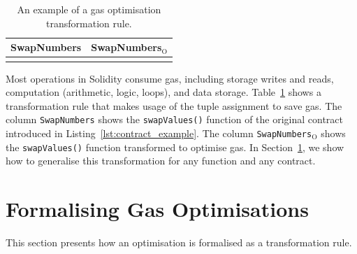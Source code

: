 \documentclass[manuscript,screen,review]{acmart}
\begin{document}
\begin{table}[htb]
\caption{An example of a gas optimisation transformation rule.}
\label{tab:optimisation}
\begin{tabular}{|p{}|p{}|}
\hline
\rowcolor[HTML]{EFEFEF}
\textbf{SwapNumbers} & \textbf{SwapNumbers$_{\mathrm{O}}$} \\ \hline
\adjustbox{valign=t}{%
\begin{minipage}{0.43\textwidth}
\begin{verbatim}

function swapValues() public {
   // Swap using a temporary variable
   uint256 temp;
   temp = A;
   A = B;
   B = temp;
   emit numbersUpdated(msg.sender, A, B);
}
\end{verbatim}
\end{minipage}}
&
\adjustbox{valign=t}{%
\begin{minipage}{0.43\textwidth}
\begin{verbatim}

function swapValues() public {
   // Single-line swap using tuple assignment
   (A, B) = (B, A);
   emit numbersUpdated(msg.sender, A, B);
}
\end{verbatim}
\end{minipage}}
\\ \hline
\end{tabular}
\end{table}
Most operations in Solidity consume gas, including storage writes and reads, computation (arithmetic, logic, loops), and data storage. Table~\ref{tab:optimisation} shows a transformation rule that makes usage of the tuple assignment to save gas. The column \texttt{SwapNumbers} shows the \texttt{swapValues()} function of the original contract introduced in Listing~\ref{lst:contract_example}. The column \texttt{SwapNumbers$_{\mathrm{O}}$} shows the \texttt{swapValues()} function transformed to optimise gas. In Section~\ref{sec:formalising_gas_optimisations}, we show how to generalise this transformation for any function and any contract.

\section{Formalising Gas Optimisations}
\label{sec:formalising_gas_optimisations}

This section presents how an optimisation is formalised as a transformation rule.
\end{document}
